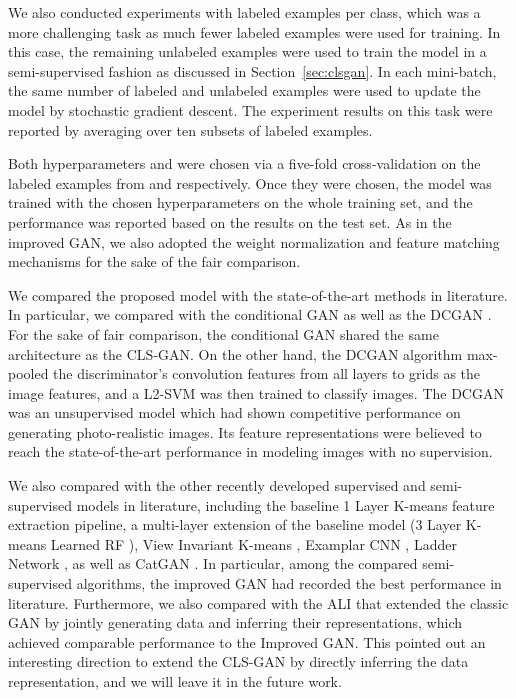 \documentclass[11pt,fullpage, letterpaper,twoside]{article}
\newcommand{\1}[1]{\mathds{1}_{\left[#1\right]}}
\begin{document}
We also conducted experiments with  labeled examples per class, which was a more challenging task as much fewer labeled examples were used for training. In this case, the remaining unlabeled examples were used to train the model in a semi-supervised fashion as discussed in Section~\ref{sec:clsgan}. In each mini-batch, the same number of labeled and unlabeled examples were used to update the model by stochastic gradient descent. The experiment results on this task were reported by averaging over ten subsets of labeled examples.

Both hyperparameters  and  were chosen via a five-fold cross-validation on the labeled examples from  and  respectively. Once they were chosen, the model was trained with the chosen hyperparameters on the whole training set, and the performance was reported based on the results on the test set. As in the improved GAN, we also adopted the weight normalization and feature matching mechanisms for the sake of the fair comparison.




We compared the proposed model with the state-of-the-art methods in literature.  In particular, we compared with the conditional GAN \cite{mirza2014conditional} as well as the DCGAN \cite{radford2015unsupervised}. For the sake of fair comparison, the conditional GAN shared the same architecture as the CLS-GAN.
On the other hand, the DCGAN algorithm \cite{radford2015unsupervised} max-pooled
the discriminator's convolution features from all layers to  grids as the image features, and a L2-SVM was then trained to classify images. The DCGAN was an unsupervised model which had shown competitive performance on generating photo-realistic images. Its feature representations were believed to reach the state-of-the-art performance in modeling images with no supervision.







We also compared with the other recently developed supervised and semi-supervised models in literature, including the baseline 1 Layer K-means feature extraction pipeline, a multi-layer extension of the baseline model (3 Layer K-means Learned RF \cite{coates2011selecting}), View Invariant K-means \cite{hui2013direct}, Examplar CNN \cite{dosovitskiydiscriminative}, Ladder Network \cite{rasmus2015semi}, as well as CatGAN \cite{springenberg2015unsupervised}.  In particular, among the compared semi-supervised algorithms, the improved GAN \cite{salimans2016improved} had recorded the best performance in literature.  Furthermore, we also compared with the ALI \cite{dumoulin2016adversarially} that extended the classic GAN by jointly generating data and inferring their representations, which achieved comparable performance to the Improved GAN. This pointed out an interesting direction to extend the CLS-GAN by directly inferring the data representation, and we will leave it in the future work.
\end{document}

